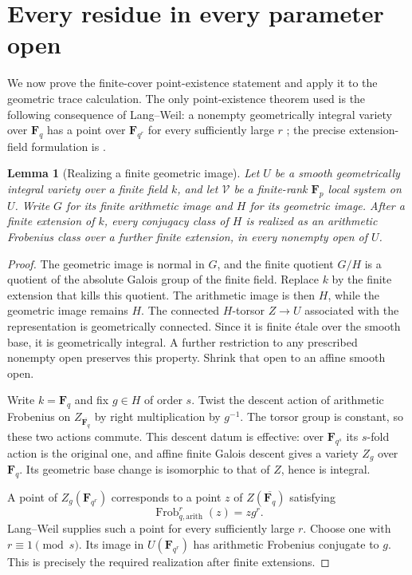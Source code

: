 \documentclass[11pt]{article}
\newtheorem{lemma}[theorem]{Lemma}
\begin{document}
\section{Every residue in every parameter open}\label{sec:pn-9}
We now prove the finite-cover point-existence statement and apply it to the geometric trace calculation. The only point-existence theorem used is the following consequence of Lang--Weil: a nonempty geometrically integral variety over $\mathbf F_q$ has a point over $\mathbf F_{q^r}$ for every sufficiently large $r$ \citep{LangWeil}; the precise extension-field formulation is \citet[Theorem~7.7.1(iii), pp.~222--223]{Poonen}.

\begin{lemma}[Realizing a finite geometric image]\label{lem:finite-image-twist}
Let $U$ be a smooth geometrically integral variety over a finite field $k$, and let $\mathcal V$ be a finite-rank $\mathbf F_p$ local system on $U$. Write $G$ for its finite arithmetic image and $H$ for its geometric image. After a finite extension of $k$, every conjugacy class of $H$ is realized as an arithmetic Frobenius class over a further finite extension, in every nonempty open of $U$.
\end{lemma}
\begin{proof}
The geometric image is normal in $G$, and the finite quotient $G/H$ is a quotient of the absolute Galois group of the finite field. Replace $k$ by the finite extension that kills this quotient. The arithmetic image is then $H$, while the geometric image remains $H$. The connected $H$-torsor $Z\to U$ associated with the representation is geometrically connected. Since it is finite \'etale over the smooth base, it is geometrically integral. A further restriction to any prescribed nonempty open preserves this property. Shrink that open to an affine smooth open.

Write $k=\mathbf F_q$ and fix $g\in H$ of order $s$. Twist the descent action of arithmetic Frobenius on $Z_{\overline{\mathbf F_q}}$ by right multiplication by $g^{-1}$. The torsor group is constant, so these two actions commute. This descent datum is effective: over $\mathbf F_{q^s}$ its $s$-fold action is the original one, and affine finite Galois descent gives a variety $Z_g$ over $\mathbf F_q$. Its geometric base change is isomorphic to that of $Z$, hence is integral.

A point of $Z_g(\mathbf F_{q^r})$ corresponds to a point $z$ of $Z(\overline{\mathbf F_q})$ satisfying
\begin{equation}
\operatorname{Frob}_{q,\mathrm{arith}}^r(z)=zg^r.
\label{eq:finite-twist-frobenius}
\end{equation}
Lang--Weil supplies such a point for every sufficiently large $r$. Choose one with $r\equiv1\pmod s$. Its image in $U(\mathbf F_{q^r})$ has arithmetic Frobenius conjugate to $g$. This is precisely the required realization after finite extensions.
\end{proof}
\end{document}
